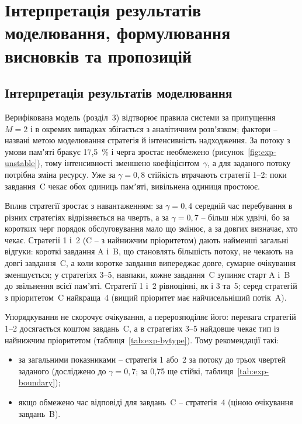 \section{Інтерпретація результатів моделювання, формулювання висновків та пропозицій}

\subsection{Інтерпретація результатів моделювання}

Верифікована модель (розділ~3) відтворює правила системи за припущення $M = 2$ і в окремих
випадках збігається з аналітичним розвʼязком; фактори -- названі метою моделювання стратегія й
інтенсивність надходження. За потоку з умови памʼяті бракує 17,5~\% і черга зростає необмежено
(рисунок~\ref{fig:exp-unstable}), тому інтенсивності зменшено коефіцієнтом~$\gamma$, а для
заданого потоку потрібна зміна ресурсу. Уже за $\gamma = 0{,}8$ стійкість втрачають стратегії 1--2: поки завдання~C чекає обох
одиниць памʼяті, вивільнена одиниця простоює.

Вплив стратегії зростає з навантаженням: за $\gamma = 0{,}4$ середній час перебування в різних
стратегіях відрізняється на чверть, а за $\gamma = 0{,}7$ -- більш ніж удвічі, бо за коротких черг
порядок обслуговування мало що змінює, а за довгих визначає, хто чекає. Стратегії 1 і~2 (C -- з
найнижчим пріоритетом) дають найменші загальні відгуки: короткі завдання A і~B, що становлять
більшість потоку, не чекають на довгі завдання~C, а коли коротке завдання випереджає довге,
сумарне очікування зменшується; у стратегіях 3--5, навпаки, кожне завдання~C зупиняє старт A і~B
до звільнення всієї памʼяті. Стратегії 1 і~2 рівноцінні, як і
3 та~5; серед стратегій з пріоритетом~C найкраща~4 (вищий пріоритет має найчисельніший потік~A).

Упорядкування не скорочує очікування, а перерозподіляє його: перевага стратегій 1--2
досягається коштом завдань~C, а в стратегіях 3--5 найдовше чекає тип із найнижчим пріоритетом
(таблиця~\ref{tab:exp-bytype}). Тому рекомендації такі:
\begin{itemize}
  \item за загальними показниками -- стратегія 1 або~2 за потоку до трьох чвертей заданого
    (досліджено до $\gamma = 0{,}7$; за 0,75 ще стійкі, таблиця~\ref{tab:exp-boundary});
  \item якщо обмежено час відповіді для завдань~C -- стратегія~4 (ціною очікування завдань~B).
\end{itemize}

